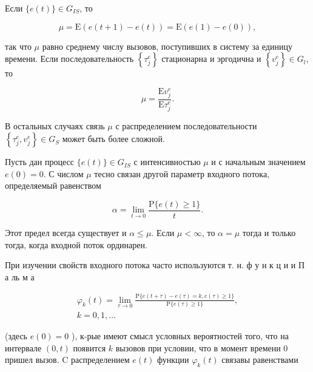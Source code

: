 \documentclass[10pt]{article}
\begin{document}
Если $\{e(t)\} \in G_{I S}$, то



\[

\mu=\mathrm{E}(e(t+1)-e(t))=\mathrm{E}(e(1)-e(0)),

\]



так что $\mu$ равно среднему числу вызовов, поступивших в систему за единицу времени. Если последовательность $\left\{\tau_{j}^{e}\right\}$ стационарна и эргодична и $\left\{v_{j}^{e}\right\} \in G_{l}$, то



\[

\mu=\frac{\mathrm{E} v_{j}^{e}}{\mathrm{E} \tau_{j}^{e}} .

\]



В остальных случаях связь $\mu$ с распределением последовательности $\left\{\tau_{j}^{e}, v_{j}^{e}\right\} \in G_{S}$ может быть более сложной.



Пусть дан процесс $\{e(t)\} \in G_{I S}$ с интенсивностью $\mu$ и с начальным значением $e(0)=0$. С числом $\mu$ тесно связан другой параметр входного потока, определяемый равенством



\[

\alpha=\lim _{t \rightarrow 0} \frac{\mathrm{P}\{e(t) \geqslant 1\}}{t} .

\]



Этот предел всегда существует и $\alpha \leqslant \mu$. Если $\mu<\infty$, то $\alpha=\mu$ тогда и только тогда, когда входной поток ординарен.



При изучении свойств входного потока часто используются т. н. ф у н к ц и и П а ль м а



\[

\begin{gathered}

\varphi_{k}(t)=\lim _{\tau \rightarrow 0} \frac{\mathrm{P}\{e(t+\tau)-e(\tau)=k, e(\tau) \geqslant 1\}}{\mathrm{P}\{e(\tau) \geqslant 1\}}, \\

k=0,1, \ldots

\end{gathered}

\]



(здесь $e(0)=0$ ), к-рые имеют смысл условных вероятностей того, что на интервале $(0, t)$ появится $k$ вызовов при условии, что в момент времени 0 пришел вызов. C распределением $e(t)$ функции $\varphi_{k}(t)$ связавы равенствами
\end{document}
